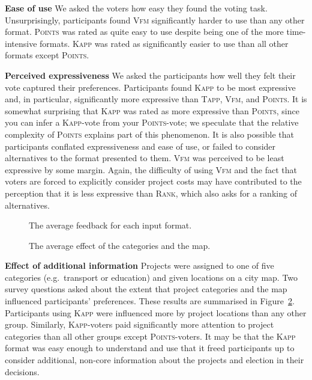 \documentclass[twoside,11pt]{article}
\newcommand{\points}{\textsc{Points}}
\newcommand{\rank}{\textsc{Rank}}
\newcommand{\vfm}{\textsc{Vfm}}
\newcommand{\kapp}{\textsc{Kapp}}
\newcommand{\tapp}{\textsc{Tapp}}
\begin{document}
\textbf{Ease of use}  We asked the voters how easy they found the voting task. Unsurprisingly, participants found \vfm{} significantly harder to use than any other format. \points{} was rated as quite easy to use despite being one of the more time-intensive formats. \kapp{} was rated as significantly easier to use than all other  formats except \points. 



\textbf{Perceived expressiveness} We asked the participants how well they felt their vote captured their preferences. 
Participants found \kapp{} to be most expressive and, in particular,  significantly more expressive than  \tapp, \vfm, and \points. It is somewhat surprising that \kapp{} was rated as more expressive than \points, since you can infer a \kapp-vote from  your \points-vote; we speculate that the relative complexity of  \points{} explains part of this phenomenon. It is also possible that participants conflated expressiveness and ease of use, or failed to consider alternatives to the format presented to them.
\vfm{} was perceived to be least expressive by some margin. Again, the  difficulty of using \vfm{} and the fact that voters are forced to explicitly consider project costs may have contributed to the perception that it is less expressive than \rank, which also asks for a ranking of alternatives.  


\begin{figure}[!h]
\begin{center}
\caption{The average feedback for each input format.
}\label{fig:feedback}
\end{center}\vspace{-3mm}
\end{figure}

\begin{figure}[!h]
\begin{center}
\caption{The average effect of the categories and the map.
}\label{fig:cat_map}
\end{center}\vspace{-5mm}
\end{figure}


\textbf{Effect of additional information}
Projects were assigned to one of five categories (e.g.\ transport or education) and given locations on a city map. Two survey questions asked about the extent that project categories and the map influenced participants' preferences. These results are summarised in Figure~\ref{fig:cat_map}.
%
Participants using \kapp{} were influenced  more by project locations than any other group. Similarly, \kapp-voters paid significantly more attention to project categories than all other groups except \points-voters. 
It may be that the \kapp{} format was easy enough to understand and use that it freed participants up to consider additional, non-core information about the projects and   election in their decisions. 
\end{document}
